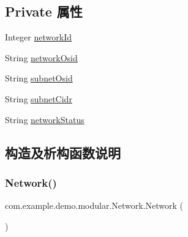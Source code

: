 \subsection*{Private 属性}
\begin{DoxyCompactItemize}
\item 
Integer \mbox{\hyperlink{classcom_1_1example_1_1demo_1_1modular_1_1_network_a4c184f144422efc3d30f15b2391cc150}{network\+Id}}
\item 
String \mbox{\hyperlink{classcom_1_1example_1_1demo_1_1modular_1_1_network_a653e6a71d84cc5a92ab6b4446c90b64d}{network\+Osid}}
\item 
String \mbox{\hyperlink{classcom_1_1example_1_1demo_1_1modular_1_1_network_a2f70a4f8f85e28c37af005fe18074deb}{subnet\+Osid}}
\item 
String \mbox{\hyperlink{classcom_1_1example_1_1demo_1_1modular_1_1_network_a77c09d06140f3d9047051d6a8033c416}{subnet\+Cidr}}
\item 
String \mbox{\hyperlink{classcom_1_1example_1_1demo_1_1modular_1_1_network_a9c13fc86c668e502aee81251ded19368}{network\+Status}}
\end{DoxyCompactItemize}


\subsection{构造及析构函数说明}
\mbox{\label{classcom_1_1example_1_1demo_1_1modular_1_1_network_ab5b8791e965a8739b1fd4c8948859b41}} 
\subsubsection{\texorpdfstring{Network()}{Network()}\hspace{0.1cm}{\footnotesize\ttfamily [1/3]}}
{\footnotesize\ttfamily com.\+example.\+demo.\+modular.\+Network.\+Network (\begin{DoxyParamCaption}{ }\end{DoxyParamCaption})}

\mbox{\label{classcom_1_1example_1_1demo_1_1modular_1_1_network_ae37a90a0742a39f30a810cb4e86a64f4}} 
